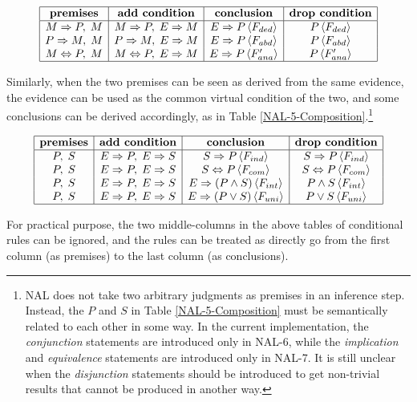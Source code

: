 \begin{table}[htb]
\[\begin{array}{|c|c|c|c|} \hline
\textbf{premises} & \textbf{add condition} & \textbf{conclusion} & \textbf{drop condition}\\
\hline
M \Rightarrow P, \; M			& M \Rightarrow P, \; E \Rightarrow M & E \Rightarrow P \, \langle F_{ded}\rangle  & P \, \langle F_{ded}\rangle  \\
P \Rightarrow M, \; M			& P \Rightarrow M, \; E \Rightarrow M & E \Rightarrow P \, \langle F_{abd}\rangle  & P \, \langle F_{abd}\rangle  \\
M \Leftrightarrow P, \; M	& M \Leftrightarrow P, \; E \Rightarrow M & E \Rightarrow P \, \langle F'_{ana}\rangle  & P \, \langle F'_{ana}\rangle  \\
\hline \end{array}\]
\caption{The Conditional Syllogistic Rules (1)}
\label{Conditional-1}
\end{table}

Similarly, when the two premises can be seen as derived from the same evidence, the evidence can be used as the common virtual condition of the two, and some conclusions can be derived accordingly, as in Table \ref{NAL-5-Composition}.\footnote{NAL does not take two arbitrary judgments as premises in an inference step. Instead, the $P$ and $S$ in Table \ref{NAL-5-Composition} must be semantically related to each other in some way.  In the current implementation, the \emph{conjunction} statements are introduced only in NAL-6, while the \emph{implication} and \emph{equivalence} statements are introduced only in NAL-7. It is still unclear when the \emph{disjunction} statements should be introduced to get non-trivial results that cannot be produced in another way.}

\begin{table}[htb]
\[\begin{array}{|c|c|c|c|} \hline
\textbf{premises} & \textbf{add condition} & \textbf{conclusion} & \textbf{drop condition}\\
\hline
P, \; S			& E \Rightarrow P, \; E \Rightarrow S & S \Rightarrow P \, \langle F_{ind}\rangle  & S \Rightarrow P \, \langle F_{ind}\rangle  \\
P, \; S			& E \Rightarrow P, \; E \Rightarrow S & S \Leftrightarrow P \, \langle F_{com}\rangle  & S \Leftrightarrow P \, \langle F_{com}\rangle  \\
P, \; S			& E \Rightarrow P, \; E \Rightarrow S & E \Rightarrow (P \wedge S) \, \langle F_{int}\rangle  & P \wedge S \, \langle F_{int}\rangle  \\
P, \; S			& E \Rightarrow P, \; E \Rightarrow S & E \Rightarrow (P \vee S) \, \langle F_{uni}\rangle  & P \vee S \, \langle F_{uni}\rangle  \\
\hline \end{array}\]
\caption{The Conditional Syllogistic Rules (2)}
\label{NAL-5-Composition}
\end{table}
For practical purpose, the two middle-columns in the above tables of conditional rules can be ignored, and the rules can be treated as directly go from the first column (as premises) to the last column (as conclusions). 

